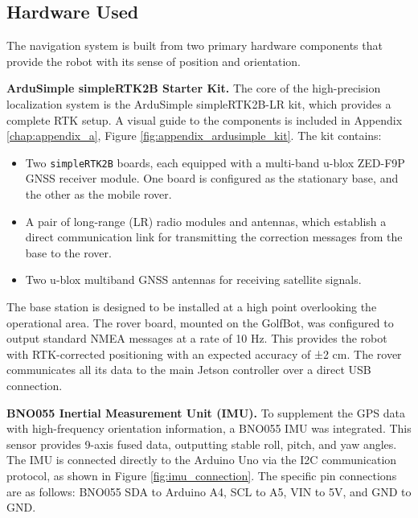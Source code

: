 \subsection{Hardware Used}
\label{ssec:nav_hardware}
The navigation system is built from two primary hardware components that provide the robot with its sense of position and orientation.

\textbf{ArduSimple simpleRTK2B Starter Kit.}
The core of the high-precision localization system is the ArduSimple simpleRTK2B-LR kit, which provides a complete RTK setup. A visual guide to the components is included in Appendix \ref{chap:appendix_a}, Figure \ref{fig:appendix_ardusimple_kit}. The kit contains:
\begin{itemize}
    \item Two \texttt{simpleRTK2B} boards, each equipped with a multi-band u-blox ZED-F9P GNSS receiver module. One board is configured as the stationary base, and the other as the mobile rover.
    \item A pair of long-range (LR) radio modules and antennas, which establish a direct communication link for transmitting the correction messages from the base to the rover.
    \item Two u-blox multiband GNSS antennas for receiving satellite signals.
\end{itemize}
The base station is designed to be installed at a high point overlooking the operational area. The rover board, mounted on the GolfBot, was configured to output standard \gls{NMEA} messages at a rate of 10 Hz. This provides the robot with RTK-corrected positioning with an expected accuracy of ±2 cm. The rover communicates all its data to the main Jetson controller over a direct USB connection.


\textbf{BNO055 Inertial Measurement Unit (IMU).}
To supplement the GPS data with high-frequency orientation information, a BNO055 IMU was integrated. This sensor provides 9-axis fused data, outputting stable roll, pitch, and yaw angles. The IMU is connected directly to the Arduino Uno via the I2C communication protocol, as shown in Figure \ref{fig:imu_connection}. The specific pin connections are as follows: BNO055 SDA to Arduino A4, SCL to A5, VIN to 5V, and GND to GND.

